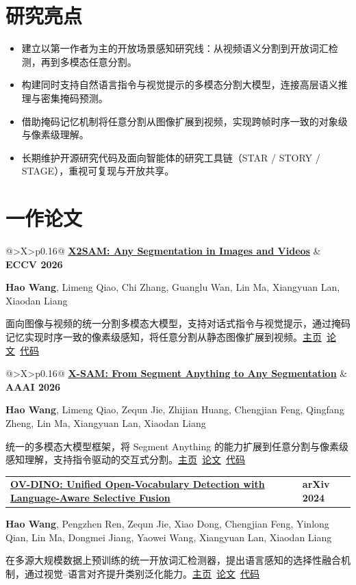 \documentclass[UTF8,10pt,letterpaper,fontset=fandol,linespread=1.15]{ctexart}
\makeatletter
\newcommand{\venue}[1]{\textcolor{accent}{\footnotesize\bfseries #1}}
\newcommand{\sep}{{\color{rule}\;\textbar\;}}
\newcommand{\publication}[5]{%
  \par\addvspace{2pt}
  \noindent\begin{minipage}{\linewidth}
  \begin{tabularx}{\textwidth}{@{}>{\RaggedRight\arraybackslash}X>{\RaggedLeft\arraybackslash}p{0.16\textwidth}@{}}
    \textbf{\href{#1}{\textcolor{ink}{#2}}} & \venue{#3}
  \end{tabularx}\par
  \vspace{-1pt}
  {\small #4}\par
  \vspace{1pt}
  \textcolor{muted}{\small #5}\par
  \end{minipage}\par
  \vspace{8pt}
}
\makeatother
\begin{document}
\section{研究亮点}
\begin{itemize}
  \item 建立以第一作者为主的开放场景感知研究线：从视频语义分割到开放词汇检测，再到多模态任意分割。
  \item 构建同时支持自然语言指令与视觉提示的多模态分割大模型，连接高层语义推理与密集掩码预测。
  \item 借助掩码记忆机制将任意分割从图像扩展到视频，实现跨帧时序一致的对象级与像素级理解。
  \item 长期维护开源研究代码及面向智能体的研究工具链（STAR / STORY / STAGE），重视可复现与开放共享。
\end{itemize}

\section{一作论文}
\publication
  {https://wanghao9610.github.io/X2SAM/}
  {X2SAM: Any Segmentation in Images and Videos}
  {ECCV 2026}
  {\textbf{Hao Wang}, Limeng Qiao, Chi Zhang, Guanglu Wan, Lin Ma, Xiangyuan Lan, Xiaodan Liang}
  {面向图像与视频的统一分割多模态大模型，支持对话式指令与视觉提示，通过掩码记忆实现时序一致的像素级感知，将任意分割从静态图像扩展到视频。\mbox{\href{https://wanghao9610.github.io/X2SAM/}{主页} \sep \href{https://arxiv.org/abs/2605.00891}{论文} \sep \href{https://github.com/wanghao9610/X2SAM}{代码}}}

\publication
  {https://wanghao9610.github.io/X-SAM/}
  {X-SAM: From Segment Anything to Any Segmentation}
  {AAAI 2026}
  {\textbf{Hao Wang}, Limeng Qiao, Zequn Jie, Zhijian Huang, Chengjian Feng, Qingfang Zheng, Lin Ma, Xiangyuan Lan, Xiaodan Liang}
  {统一的多模态大模型框架，将 Segment Anything 的能力扩展到任意分割与像素级感知理解，支持指令驱动的交互式分割。\mbox{\href{https://wanghao9610.github.io/X-SAM/}{主页} \sep \href{https://arxiv.org/abs/2508.04655}{论文} \sep \href{https://github.com/wanghao9610/X-SAM}{代码}}}

\publication
  {https://wanghao9610.github.io/OV-DINO/}
  {OV-DINO: Unified Open-Vocabulary Detection with Language-Aware Selective Fusion}
  {arXiv 2024}
  {\textbf{Hao Wang}, Pengzhen Ren, Zequn Jie, Xiao Dong, Chengjian Feng, Yinlong Qian, Lin Ma, Dongmei Jiang, Yaowei Wang, Xiangyuan Lan, Xiaodan Liang}
  {在多源大规模数据上预训练的统一开放词汇检测器，提出语言感知的选择性融合机制，通过视觉--语言对齐提升类别泛化能力。\mbox{\href{https://wanghao9610.github.io/OV-DINO/}{主页} \sep \href{https://arxiv.org/abs/2407.07844}{论文} \sep \href{https://github.com/wanghao9610/OV-DINO}{代码}}}
\end{document}
